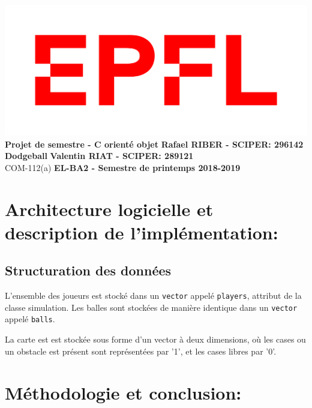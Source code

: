 \documentclass[a4paper, 11pt]{article}
\begin{document}
\noindent \includegraphics[scale=0.2]{figures/logo.png}\\
\large\textbf{Projet de semestre - C\raisebox{.5\height}{\scalebox{.5}{++}} orienté objet} \hfill \textbf{Rafael RIBER  - SCIPER: 296142} \\
\large\textbf{Dodgeball} \hfill \hfill \textbf{Valentin RIAT - SCIPER: 289121}\\
\normalsize COM-112(a) \hfill \textbf{EL-BA2 - Semestre de printemps 2018-2019}\\

\section{Architecture logicielle et description de l’implémentation:}

\subsection{Structuration des données}

L'ensemble des joueurs est stocké dans un \texttt{vector} appelé \texttt{players}, attribut de la classe simulation. Les balles sont stockées de manière identique dans un \texttt{vector} appelé \texttt{balls}.

La carte est est stockée sous forme d'un vector à deux dimensions, où les cases ou un obstacle est présent sont représentées par '1', et les cases libres par '0'.

\section{Méthodologie et conclusion:}
\end{document}
